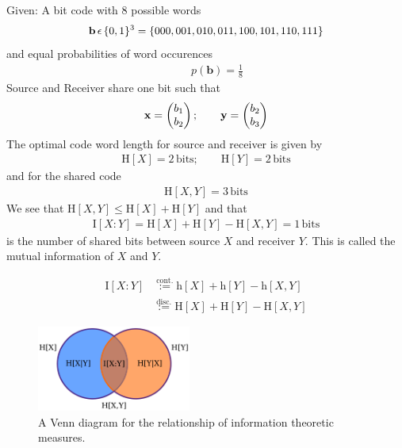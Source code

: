 \begin{example}
	Given: A bit code with 8 possible words
	\begin{align*}
		\mathbf{b} \, \epsilon \, \{0,1\}^3 = \{000,001,010,011,100,101,110,111\}
	\end{align*}
	and equal probabilities of word occurences
	\begin{align*}
		\qquad p(\mathbf{b}) = \frac{1}{8}
	\end{align*}	  
	Source and Receiver share one bit such that
	\begin{align*}
 		\mathbf{x} = \begin{pmatrix} b_1 \\ b_2 \end{pmatrix}; \qquad 
		\mathbf{y} = \begin{pmatrix} b_2 \\ b_3 \end{pmatrix}
	\end{align*} 	
	The optimal code word length for source and receiver is given by
	\begin{align*}
		\mathrm{H}[X] = 2 \, \mathrm{bits}; \qquad \mathrm{H}[Y] = 2 \, \mathrm{bits}
	\end{align*}
	and for the shared code
	\begin{align*}
			\mathrm{H}[X,Y] = 3 \, \mathrm{bits}
	\end{align*}
	We see that $\mathrm{H}[X,Y] \leq \mathrm{H}[X] + \mathrm{H}[Y]$ and that
	\begin{align*}
		\mathrm{I}[X:Y] = \mathrm{H}[X] + \mathrm{H}[Y] - \mathrm{H}[X,Y] = 1 \, \mathrm{bits}
	\end{align*}
	is the number of shared bits between source $X$ and receiver $Y$. This is called the mutual
	information of $X$ and $Y$.
\end{example}


\begin{definition}
\begin{align*}
		\mathrm{I}[X:Y]
		      & \stackrel{\text{cont.}}{:=} \mathrm{h}[X] + \mathrm{h}[Y] - \mathrm{h}[X,Y] \\
   		      & \stackrel{\text{disc.}}{:=} \mathrm{H}[X] + \mathrm{H}[Y] - \mathrm{H}[X,Y]
\end{align*}
\end{definition}

\begin{figure}
	\centering
	\includegraphics[width=0.45\textwidth]{./lecture12/venn.pdf}
	\caption{A Venn diagram for the relationship of information theoretic measures.}
\end{figure}

